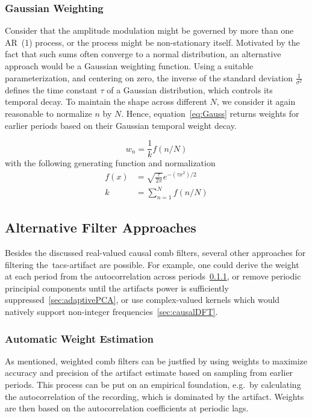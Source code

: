 \documentclass[a4paper]{article}
\begin{document}
\subsubsection{Gaussian Weighting}

Consider that the amplitude modulation might be governed by more than one AR~(1) process, or the process might be non-stationary itself.
Motivated by the fact that such sums  often converge to a normal distribution, an alternative approach would be a Gaussian weighting function.
Using a suitable parameterization, and centering on zero, the inverse of the standard deviation $\frac{1}{\sigma^2}$ defines the time constant $\tau$ of a Gaussian distribution, which controls its temporal decay.
To maintain the shape across different $N$, we consider it again reasonable to normalize $n$ by $N$. Hence, equation~\eqref{eq:Gauss} returns weights for earlier periods based on their Gaussian temporal weight decay.

\begin{equation}
    w_n = \frac{1}{k} f(n/N)\label{eq:Gauss}
\end{equation}
with the following generating function and normalization
\begin{align}
    f(x)  & = \sqrt{\frac{\tau}{2\pi}} e^{-(\tau x^2)/2}  \\
    k  & = \sum_{n=1}^{N} f(n/N)\label{eq:NormGauss}
\end{align}

\subsection{Alternative Filter Approaches}

Besides the discussed real-valued causal comb filters, several other approaches for filtering the~\gls{tacs}-artifact are possible. For example, one could derive the weight at each period from the autocorrelation across periods~\ref{sec:automaticKernel}, or remove periodic principial components until the artifacts power is sufficiently suppressed~\ref{sec:adaptivePCA}, or use complex-valued kernels which would natively support non-integer frequencies~\ref{sec:causalDFT}.

\subsubsection{Automatic Weight Estimation}\label{sec:automaticKernel}

As mentioned, weighted comb filters can be justfied by using  weights to maximize accuracy and precision of the artifact estimate based on sampling from earlier periods.
This process can be put on an empirical foundation, e.g.\ by calculating the autocorrelation of the recording, which is dominated by the artifact. Weights are then based on the autocorrelation coefficients at periodic lags.
\end{document}
